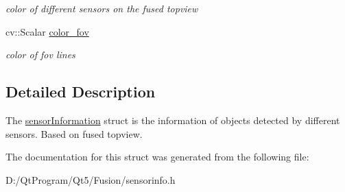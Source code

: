 \begin{DoxyCompactItemize}
\begin{DoxyCompactList}\small\item\em color of different sensors on the fused topview \end{DoxyCompactList}\item 
\hypertarget{struct_sensor_info_1_1sensor_information_af482cb97ab6402269fb9ea0d8e6d4ba8}{}cv\+::\+Scalar \hyperlink{struct_sensor_info_1_1sensor_information_af482cb97ab6402269fb9ea0d8e6d4ba8}{color\+\_\+fov}\label{struct_sensor_info_1_1sensor_information_af482cb97ab6402269fb9ea0d8e6d4ba8}

\begin{DoxyCompactList}\small\item\em color of fov lines \end{DoxyCompactList}\end{DoxyCompactItemize}


\subsection{Detailed Description}
The \hyperlink{struct_sensor_info_1_1sensor_information}{sensor\+Information} struct is the information of objects detected by different sensors. Based on fused topview. 

The documentation for this struct was generated from the following file\+:\begin{DoxyCompactItemize}
\item 
D\+:/\+Qt\+Program/\+Qt5/\+Fusion/sensorinfo.\+h\end{DoxyCompactItemize}
